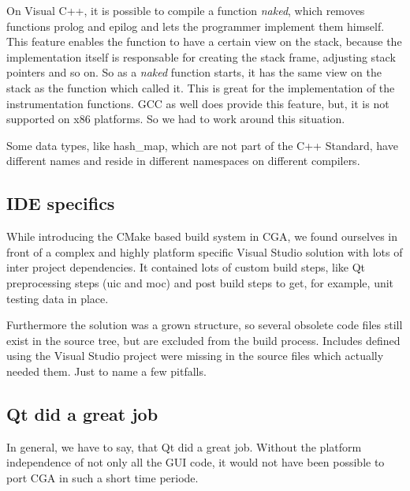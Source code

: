 On Visual C++, it is possible to compile a function \emph{naked}, which removes functions prolog and epilog and lets the programmer implement them himself. This feature enables the function to have a certain view on the stack, because the implementation itself is responsable for creating the stack frame, adjusting stack pointers and so on. So as a \emph{naked} function starts, it has the same view on the stack as the function which called it. This is great for the implementation of the instrumentation functions. GCC as well does provide this feature, but, it is not supported on x86 platforms. So we had to work around this situation.

Some data types, like hash\_map, which are not part of the C++ Standard, have different names and reside in different namespaces on different compilers.

\subsection{IDE specifics} While introducing the CMake based build system in CGA, we found ourselves in front of a complex and highly platform specific Visual Studio solution with lots of inter project dependencies. It contained lots of custom build steps, like Qt preprocessing steps (uic and moc) and post build steps to get, for example, unit testing data in place.

Furthermore the solution was a grown structure, so several obsolete code files still exist in the source tree, but are excluded from the build process. Includes defined using the Visual Studio project were missing in the source files which actually needed them. Just to name a few pitfalls.

\subsection{Qt did a great job} In general, we have to say, that Qt did a great job. Without the platform independence of not only all the GUI code, it would not have been possible to port CGA in such a short time periode. 
